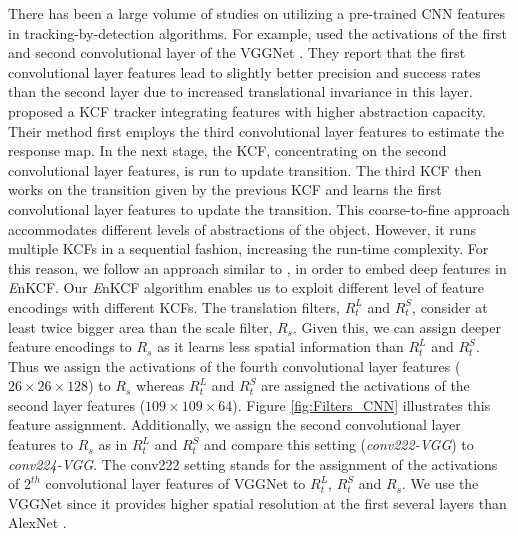 \documentclass[10pt,twocolumn,letterpaper]{article}
\begin{document}
There has been a large volume of studies on utilizing a pre-trained
CNN features in tracking-by-detection algorithms. For example,
\cite{danelljan2015convolutional} used the activations of the first
and second convolutional layer of the VGGNet \cite{simonyan2014very}.
They report that the first convolutional layer features lead to
slightly better precision and success rates than the second layer due
to increased translational invariance in this
layer. \cite{ma2015hierarchical} proposed a KCF tracker integrating
features with higher abstraction capacity.  Their method first employs
the third convolutional layer features to estimate the response
map. In the next stage, the KCF, concentrating on the second
convolutional layer features, is run to update transition. The third
KCF then works on the transition given by the previous KCF and learns
the first convolutional layer features to update the transition. This
coarse-to-fine approach accommodates different levels of abstractions
of the object. However, it runs multiple KCFs in a sequential fashion,
increasing the run-time complexity. For this reason, we follow an
approach similar to \cite{danelljan2015convolutional}, in order to
embed deep features in {\it E}nKCF. Our {\it E}nKCF algorithm enables
us to exploit different level of feature encodings with different
KCFs. The translation filters, $R_{t}^{L}$ and $R_{t}^{S}$, consider
at least twice bigger area than the scale filter, $R_{s}$. Given this,
we can assign deeper feature encodings to $R_{s}$ as it learns less
spatial information than $R_{t}^{L}$ and $R_{t}^{S}$. Thus we assign
the activations of the fourth convolutional layer features
($26\times26\times128$) to $R_{s}$ whereas $R_{t}^{L}$ and $R_{t}^{S}$
are assigned the activations of the second layer features
($109\times109\times64$). Figure \ref{fig:Filters_CNN} illustrates
this feature assignment. Additionally, we assign the second
convolutional layer features to $R_{s}$ as in $R_{t}^{L}$ and
$R_{t}^{S}$ and compare this setting (\textit{conv222-VGG}) to
\textit{conv224-VGG}. The conv222 setting stands for the assignment of
the activations of $2^{th}$ convolutional layer features of VGGNet to
$R_{t}^{L}$, $R_{t}^{S}$ and $R_{s}$. We use the VGGNet since it
provides higher spatial resolution at the first several layers than
AlexNet \cite{krizhevsky2012imagenet}.
\end{document}
